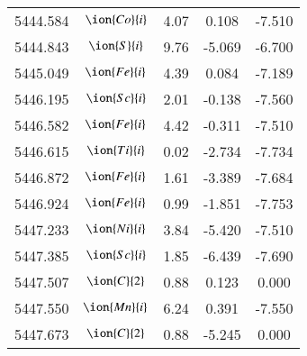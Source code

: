 \documentclass[fleqn,usenatbib]{mnras}
\begin{document}
\begin{center}
\begin{table}
\begin{tabular}{ccccc}
5444.584 &  $\ion{Co}{i}$  & 4.07 & 0.108 & -7.510 \\ 
5444.843 &  $\ion{S}{i}$  & 9.76 & -5.069 & -6.700 \\ 
5445.049 &  $\ion{Fe}{i}$  & 4.39 & 0.084 & -7.189 \\ 
5446.195 &  $\ion{Sc}{i}$  & 2.01 & -0.138 & -7.560 \\ 
5446.582 &  $\ion{Fe}{i}$  & 4.42 & -0.311 & -7.510 \\ 
5446.615 &  $\ion{Ti}{i}$  & 0.02 & -2.734 & -7.734 \\ 
5446.872 &  $\ion{Fe}{i}$  & 1.61 & -3.389 & -7.684 \\ 
5446.924 &  $\ion{Fe}{i}$  & 0.99 & -1.851 & -7.753 \\ 
5447.233 &  $\ion{Ni}{i}$  & 3.84 & -5.420 & -7.510 \\ 
5447.385 &  $\ion{Sc}{i}$  & 1.85 & -6.439 & -7.690 \\ 
5447.507 &  $\ion{C}{2}$ & 0.88 & 0.123 & 0.000 \\ 
5447.550 &  $\ion{Mn}{i}$  & 6.24 & 0.391 & -7.550 \\ 
5447.673 &  $\ion{C}{2}$ & 0.88 & -5.245 & 0.000 \\ 
 \end{tabular}
 \end{table}
 \end{center}
\end{document}
